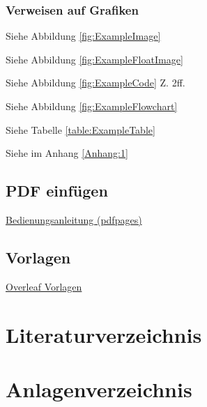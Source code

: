\subsubsection{Verweisen auf Grafiken}

Siehe Abbildung \ref{fig:ExampleImage}

Siehe Abbildung \ref{fig:ExampleFloatImage}

Siehe Abbildung \ref{fig:ExampleCode} Z. 2ff.

Siehe Abbildung \ref{fig:ExampleFlowchart}

Siehe Tabelle \ref{table:ExampleTable}

Siehe im Anhang \ref{Anhang:1}
\newpage

\subsection{PDF einfügen}

\href{https://texdoc.org/serve/pdfpages.pdf/0}{Bedienungsanleitung (pdfpages)}
%
\newpage

\subsection{Vorlagen}

\href{https://de.overleaf.com/latex/templates}{Overleaf Vorlagen}

\newpage


\setcounter{page}{\value{savepage}}

\section*{Literaturverzeichnis}


\printbibliography

\newpage
\section*{Anlagenverzeichnis}
\captionsetup[figure]{list=no}
\setcounter{figure}{0}
\renewcommand{\figurename}{Anhang}
\renewcommand{\thefigure}{\arabic{figure}}


